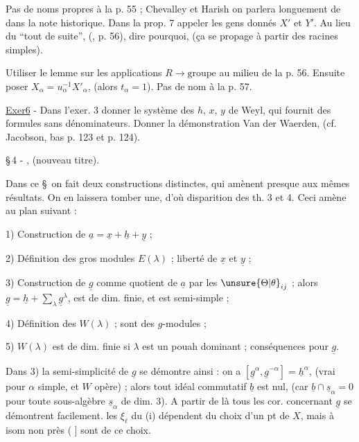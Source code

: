 Pas de noms propres à la p. 55 ; Chevalley et Harish on parlera longuement de dans la note historique. Dans la prop. 7 appeler les gens donnés $X'$ et $Y'$. Au lieu du ``tout de suite'', (, p. 56), dire pourquoi, (ça se propage à partir des racines simples).

Utiliser le lemme sur les applications $R\longrightarrow\text{groupe}$ au milieu de la p. 56. Ensuite poser $X_\alpha=u_\alpha^{-1}X'_\alpha$, (alors $t_\alpha=1$). Pas de nom à la p. 57.

\uline{Exer6} - Dans l'exer. 3 donner le système des $h$, $x$, $y$ de Weyl, qui fournit des formules sans dénominateurs. Donner la démonstration Van der Waerden, (cf. Jacobson, bas p. 123 et p. 124).

\S\,4 - , (nouveau titre).

Dans ce \S\ on fait deux constructions distinctes, qui amènent presque aux mêmes résultats. On en laissera tomber une, d'où disparition des th. 3 et 4. Ceci amène au plan suivant :

1) Construction de $\underline{a}=\underline{x}+\underline{h}+\underline{y}$ ;

2) Définition des gros modules $E(\lambda)$ ; liberté de $\underline{x}$ et $\underline{y}$ ;

3) Construction de $\underline{g}$ comme quotient de $\underline{a}$ par les $\unsure{\Theta|\theta}_{ij}$ ; alors $\underline{g}=\underline{h}+\sum_{\lambda}\underline{g}^{\lambda}$, est de dim. finie, et est semi-simple ;

4) Définition des $W(\lambda)$ ; sont des $g$-modules ;

5) $W(\lambda)$ est de dim. finie si $\lambda$ est un pouah dominant ; conséquences pour $\underline{g}$.

Dans 3) la semi-simplicité de $\underline{g}$ se démontre ainsi : on a $[\underline{g}^{\alpha},\underline{g}^{-\alpha}]=\underline{h}^{\alpha}$, (vrai pour $\alpha$ simple, et $W$ opère) ; alors tout idéal commutatif $\underline{b}$ est nul, (car $\underline{b}\cap\underline{s}_\alpha=0$ pour toute sous-algèbre $\underline{s}_\alpha$ de dim. 3). A partir de là tous les cor. concernant $\underline{g}$ se démontrent facilement.
les $\xi_{\ell}$ du (i) dépendent du choix d'un pt  de $X$, mais à isom non  près (  ]  sont  de ce choix.

